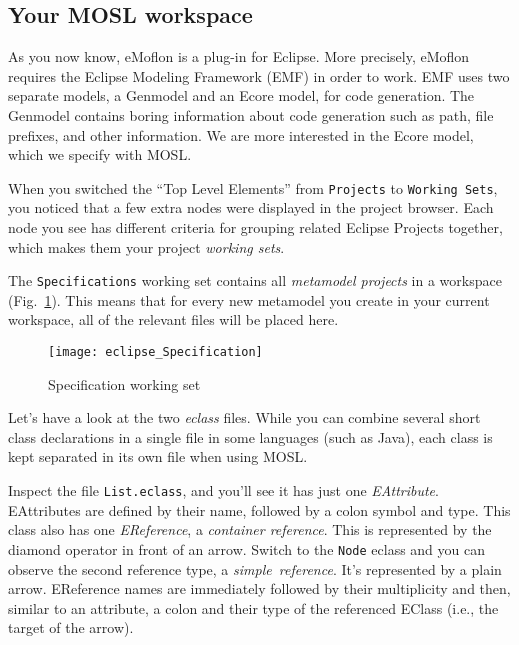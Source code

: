 \newpage
\texHeader
\hypertarget{projectStructure tex}{}
\subsection{Your MOSL workspace}

As you now know, eMoflon is a plug-in for Eclipse. More precisely, eMoflon requires the Eclipse Modeling Framework (EMF) in order to work. EMF uses two separate
models, a Genmodel and an Ecore model, for code generation. The Genmodel contains boring information about code generation such as path, file prefixes, and
other information. We are more interested in the Ecore model, which we specify with MOSL.

When you switched the ``Top Level Elements'' from \texttt{Projects} to \texttt{Working Sets}, you noticed that a few extra nodes were displayed in the project
browser. Each node you see has different criteria for grouping related Eclipse Projects together, which makes them your project \emph{working sets}.

The \texttt{Specifications} working set contains all \emph{metamodel projects} in a workspace (Fig.~\ref{fig_modelSpecification}). This means that for every
new metamodel you create in your current workspace, all of the relevant files will be placed here.

 \begin{figure}[htbp]
  \centering
  \texttt{[image: eclipse\_Specification]}
  \caption{Specification working set}
  \label{fig_modelSpecification}
\end{figure}
  
Let's have a look at the two \emph{eclass} files. While you can combine several short class declarations in a single file in some languages (such as Java),
each class is kept separated in its own file when using MOSL.

Inspect the file \texttt{List.eclass}, and you'll see it has just one \emph{EAttribute}. EAttributes are defined by their name, followed by a colon
symbol and type. This class also has one \emph{EReference}, a \emph{container reference}. This is represented by the diamond operator in front of an arrow.
Switch to the \texttt{Node} eclass and you can observe the second reference type, a \emph{simple~reference}. It's represented by a plain arrow. EReference names are
immediately followed by their multiplicity and then, similar to an attribute, a colon and their type of the referenced EClass (i.e., the target of the arrow).

